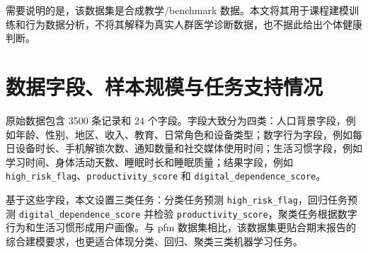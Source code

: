 需要说明的是，该数据集是合成教学/benchmark 数据。本文将其用于课程建模训练和行为数据分析，不将其解释为真实人群医学诊断数据，也不据此给出个体健康判断。

\section{数据字段、样本规模与任务支持情况}

原始数据包含 3500 条记录和 24 个字段。字段大致分为四类：人口背景字段，例如年龄、性别、地区、收入、教育、日常角色和设备类型；数字行为字段，例如每日设备时长、手机解锁次数、通知数量和社交媒体使用时间；生活习惯字段，例如学习时间、身体活动天数、睡眠时长和睡眠质量；结果字段，例如 \texttt{high\_risk\_flag}、\texttt{productivity\_score} 和 \texttt{digital\_dependence\_score}。

基于这些字段，本文设置三类任务：分类任务预测 \texttt{high\_risk\_flag}，回归任务预测 \texttt{digital\_dependence\_score} 并检验 \texttt{productivity\_score}，聚类任务根据数字行为和生活习惯形成用户画像。与 pfm 数据集相比，该数据集更贴合期末报告的综合建模要求，也更适合体现分类、回归、聚类三类机器学习任务。
